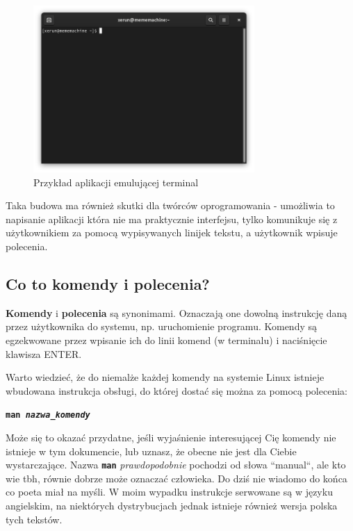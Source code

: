 \documentclass[12pt]{article}
\newcommand{\ttbf}[1]{
    \texttt{\textbf{#1}}
}
\begin{document}
\begin{figure}[H]
    \centering
    \includegraphics[width=0.75\textwidth]{przyklad terminal.png}
    \caption{Przykład aplikacji emulującej terminal}
\end{figure}

Taka budowa ma również skutki dla twórców oprogramowania - umożliwia to napisanie aplikacji która nie ma praktycznie interfejsu, tylko komunikuje się z użytkownikiem za pomocą wypisywanych linijek tekstu, a użytkownik wpisuje polecenia. 

\subsection{Co to komendy i polecenia?}

\textbf{Komendy} i \textbf{polecenia} są synonimami. Oznaczają one dowolną instrukcję daną przez użytkownika do systemu, np. uruchomienie programu. Komendy są egzekwowane przez wpisanie ich do linii komend (w terminalu) i naciśnięcie klawisza ENTER.

Warto wiedzieć, że do niemalże każdej komendy na systemie Linux istnieje wbudowana instrukcja obsługi, do której dostać się można za pomocą polecenia:

\ttbf{man \emph{nazwa\_komendy}}

Może się to okazać przydatne, jeśli wyjaśnienie interesującej Cię komendy nie istnieje w tym dokumencie, lub uznasz, że obecne nie jest dla Ciebie wystarczające. Nazwa \ttbf{man} \emph{prawdopodobnie} pochodzi od słowa ``manual``, ale kto wie tbh, równie dobrze może oznaczać człowieka. Do dziś nie wiadomo do końca co poeta miał na myśli. W moim wypadku instrukcje serwowane są w języku angielskim, na niektórych dystrybucjach jednak istnieje również wersja polska tych tekstów.
\end{document}
